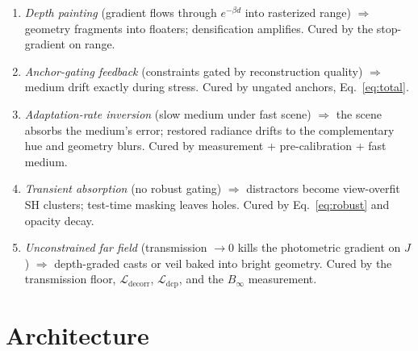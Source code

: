 \documentclass[11pt,a4paper]{article}
\newcommand{\Binf}{B_\infty}
\newcommand{\J}{J}
\newcommand{\Lcal}{\mathcal{L}}
\begin{document}
\begin{enumerate}[leftmargin=1.2cm,itemsep=2pt]
    \item \emph{Depth painting} (gradient flows through $e^{-\beta d}$ into rasterized range) $\Rightarrow$ geometry fragments into floaters; densification amplifies. Cured by the stop-gradient on range.
    \item \emph{Anchor-gating feedback} (constraints gated by reconstruction quality) $\Rightarrow$ medium drift exactly during stress. Cured by ungated anchors, Eq.~\eqref{eq:total}.
    \item \emph{Adaptation-rate inversion} (slow medium under fast scene) $\Rightarrow$ the scene absorbs the medium's error; restored radiance drifts to the complementary hue and geometry blurs. Cured by measurement + pre-calibration + fast medium.
    \item \emph{Transient absorption} (no robust gating) $\Rightarrow$ distractors become view-overfit SH clusters; test-time masking leaves holes. Cured by Eq.~\eqref{eq:robust} and opacity decay.
    \item \emph{Unconstrained far field} (transmission $\to 0$ kills the photometric gradient on $\J$) $\Rightarrow$ depth-graded casts or veil baked into bright geometry. Cured by the transmission floor, $\Lcal_{\text{decorr}}$, $\Lcal_{\text{dcp}}$, and the $\Binf$ measurement.
\end{enumerate}

\section{Architecture}
\end{document}

